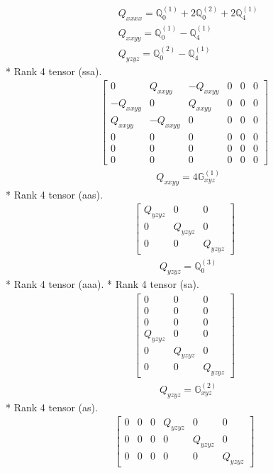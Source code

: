 \documentclass[fleqn,8pt,landscape]{jsarticle}
\begin{document}
\begin{align*}
& Q_{xxxx} = \mathbb{Q}_{0}^{(1)} + 2 \mathbb{Q}_{0}^{(2)} + 2 \mathbb{Q}_{4}^{(1)} \\
& Q_{xxyy} = \mathbb{Q}_{0}^{(1)} - \mathbb{Q}_{4}^{(1)} \\
& Q_{yzyz} = \mathbb{Q}_{0}^{(2)} - \mathbb{Q}_{4}^{(1)}
\end{align*}
* Rank 4 tensor (ssa).
\begin{align*}
\begin{bmatrix} 0 & Q_{xxyy} & - Q_{xxyy} & 0 & 0 & 0 \\ - Q_{xxyy} & 0 & Q_{xxyy} & 0 & 0 & 0 \\ Q_{xxyy} & - Q_{xxyy} & 0 & 0 & 0 & 0 \\ 0 & 0 & 0 & 0 & 0 & 0 \\ 0 & 0 & 0 & 0 & 0 & 0 \\ 0 & 0 & 0 & 0 & 0 & 0 \end{bmatrix}
\end{align*}
\begin{align*}
& Q_{xxyy} = 4 \mathbb{G}_{xyz}^{(1)}
\end{align*}
* Rank 4 tensor (aas).
\begin{align*}
\begin{bmatrix} Q_{yzyz} & 0 & 0 \\ 0 & Q_{yzyz} & 0 \\ 0 & 0 & Q_{yzyz} \end{bmatrix}
\end{align*}
\begin{align*}
& Q_{yzyz} = \mathbb{Q}_{0}^{(3)}
\end{align*}
* Rank 4 tensor (aaa).
* Rank 4 tensor (sa).
\begin{align*}
\begin{bmatrix} 0 & 0 & 0 \\ 0 & 0 & 0 \\ 0 & 0 & 0 \\ Q_{yzyz} & 0 & 0 \\ 0 & Q_{yzyz} & 0 \\ 0 & 0 & Q_{yzyz} \end{bmatrix}
\end{align*}
\begin{align*}
& Q_{yzyz} = \mathbb{G}_{xyz}^{(2)}
\end{align*}
* Rank 4 tensor (as).
\begin{align*}
\begin{bmatrix} 0 & 0 & 0 & Q_{yzyz} & 0 & 0 \\ 0 & 0 & 0 & 0 & Q_{yzyz} & 0 \\ 0 & 0 & 0 & 0 & 0 & Q_{yzyz} \end{bmatrix}
\end{align*}
\end{document}
